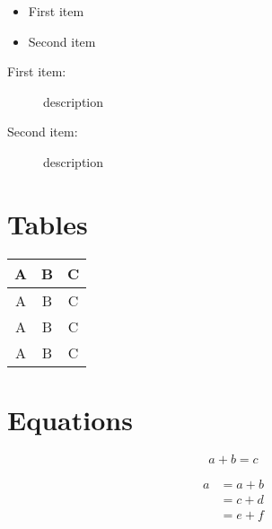 \begin{itemize}
    \item First item
    \item Second item
\end{itemize}

\begin{description}
    \item[First item:] description
    \item[Second item:] description
\end{description}

\section{Tables}

\begin{tabular}{ccc}
    \toprule
    \textbf{A} & \textbf{B} & \textbf{C} \\
    \midrule
    A & B & C \\
    \addlinespace 
    A & B & C \\
    A & B & C \\
    \bottomrule
\end{tabular}

\section{Equations}

\begin{equation}
    a + b = c
\end{equation}

\begin{align*}
    a &= a + b \\
      &= c + d \\
      &= e + f
\end{align*}
